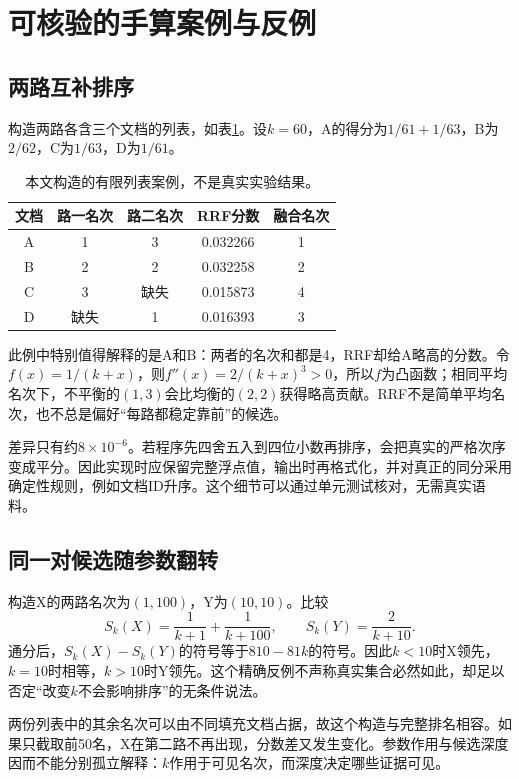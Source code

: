\documentclass[sigconf,nonacm]{acmart}
\begin{document}
\section{可核验的手算案例与反例}
\subsection{两路互补排序}
构造两路各含三个文档的列表，如表\ref{tab:toy}。设$k=60$，A的得分为$1/61+1/63$，B为$2/62$，C为$1/63$，D为$1/61$。
\begin{table}[ht]
\caption{本文构造的有限列表案例，不是真实实验结果。}
\label{tab:toy}
\centering
\begin{tabular}{ccccc}\toprule
文档 & 路一名次 & 路二名次 & RRF分数 & 融合名次\\\midrule
A&1&3&0.032266&1\\
B&2&2&0.032258&2\\
C&3&缺失&0.015873&4\\
D&缺失&1&0.016393&3\\\bottomrule
\end{tabular}
\end{table}
此例中特别值得解释的是A和B：两者的名次和都是4，RRF却给A略高的分数。令$f(x)=1/(k+x)$，则$f''(x)=2/(k+x)^3>0$，所以$f$为凸函数；相同平均名次下，不平衡的$(1,3)$会比均衡的$(2,2)$获得略高贡献。RRF不是简单平均名次，也不总是偏好“每路都稳定靠前”的候选。

差异只有约$8\times10^{-6}$。若程序先四舍五入到四位小数再排序，会把真实的严格次序变成平分。因此实现时应保留完整浮点值，输出时再格式化，并对真正的同分采用确定性规则，例如文档ID升序。这个细节可以通过单元测试核对，无需真实语料。

\subsection{同一对候选随参数翻转}
构造X的两路名次为$(1,100)$，Y为$(10,10)$。比较
\begin{equation}
 S_k(X)=\frac1{k+1}+\frac1{k+100},\qquad
 S_k(Y)=\frac2{k+10}.
\end{equation}
通分后，$S_k(X)-S_k(Y)$的符号等于$810-81k$的符号。因此$k<10$时X领先，$k=10$时相等，$k>10$时Y领先。这个精确反例不声称真实集合必然如此，却足以否定“改变$k$不会影响排序”的无条件说法。

两份列表中的其余名次可以由不同填充文档占据，故这个构造与完整排名相容。如果只截取前50名，X在第二路不再出现，分数差又发生变化。参数作用与候选深度因而不能分别孤立解释：$k$作用于可见名次，而深度决定哪些证据可见。
\end{document}
